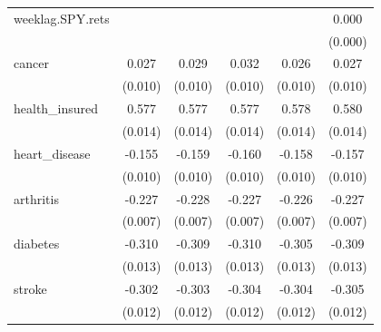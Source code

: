 \documentclass[11pt,a4paper,oldfontcommands]{memoir}
\begin{document}
{\begin{footnotesize}
\begin{tiny}
\begin{longtable}{l*{5}{c}}
weeklag.SPY.rets    &                     &                     &                     &                     &       0.000\sym{***}\\
                    &                     &                     &                     &                     &     (0.000)         \\

cancer              &       0.027\sym{**} &       0.029\sym{**} &       0.032\sym{**} &       0.026\sym{**} &       0.027\sym{**} \\
                    &     (0.010)         &     (0.010)         &     (0.010)         &     (0.010)         &     (0.010)         \\
 
health\_insured      &       0.577\sym{***}&       0.577\sym{***}&       0.577\sym{***}&       0.578\sym{***}&       0.580\sym{***}\\
                    &     (0.014)         &     (0.014)         &     (0.014)         &     (0.014)         &     (0.014)         \\
 
heart\_disease       &      -0.155\sym{***}&      -0.159\sym{***}&      -0.160\sym{***}&      -0.158\sym{***}&      -0.157\sym{***}\\
                    &     (0.010)         &     (0.010)         &     (0.010)         &     (0.010)         &     (0.010)         \\
 
arthritis           &      -0.227\sym{***}&      -0.228\sym{***}&      -0.227\sym{***}&      -0.226\sym{***}&      -0.227\sym{***}\\
                    &     (0.007)         &     (0.007)         &     (0.007)         &     (0.007)         &     (0.007)         \\
 
diabetes            &      -0.310\sym{***}&      -0.309\sym{***}&      -0.310\sym{***}&      -0.305\sym{***}&      -0.309\sym{***}\\
                    &     (0.013)         &     (0.013)         &     (0.013)         &     (0.013)         &     (0.013)         \\
 
stroke              &      -0.302\sym{***}&      -0.303\sym{***}&      -0.304\sym{***}&      -0.304\sym{***}&      -0.305\sym{***}\\
                    &     (0.012)         &     (0.012)         &     (0.012)         &     (0.012)         &     (0.012)         \\
 

\end{longtable}
\end{tiny}
\end{footnotesize}}
\end{document}
